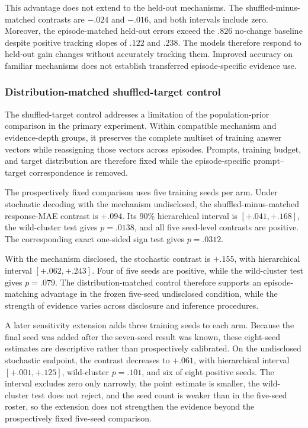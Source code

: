 This advantage does not extend to the held-out mechanisms.
The shuffled-minus-matched contrasts are \(-.024\) and \(-.016\), and both intervals include zero.
Moreover, the episode-matched held-out errors exceed the $.826$ no-change baseline despite positive tracking slopes of $.122$ and $.238$.
The models therefore respond to held-out gain changes without accurately tracking them.
Improved accuracy on familiar mechanisms does not establish transferred episode-specific evidence use.

\subsubsection{Distribution-matched shuffled-target control}
\label{app:exp3-shuffled-control}

The shuffled-target control addresses a limitation of the population-prior comparison in the primary experiment.
Within compatible mechanism and evidence-depth groups, it preserves the complete multiset of training answer vectors while reassigning those vectors across episodes.
Prompts, training budget, and target distribution are therefore fixed while the episode-specific prompt--target correspondence is removed.

The prospectively fixed comparison uses five training seeds per arm.
Under stochastic decoding with the mechanism undisclosed, the shuffled-minus-matched response-MAE contrast is \(+.094\).
Its 90\% hierarchical interval is \([+.041,+.168]\), the wild-cluster test gives \(p=.0138\), and all five seed-level contrasts are positive.
The corresponding exact one-sided sign test gives \(p=.0312\).

With the mechanism disclosed, the stochastic contrast is \(+.155\), with hierarchical interval \([+.062,+.243]\).
Four of five seeds are positive, while the wild-cluster test gives \(p=.079\).
The distribution-matched control therefore supports an episode-matching advantage in the frozen five-seed undisclosed condition, while the strength of evidence varies across disclosure and inference procedures.

A later sensitivity extension adds three training seeds to each arm.
Because the final seed was added after the seven-seed result was known, these eight-seed estimates are descriptive rather than prospectively calibrated.
On the undisclosed stochastic endpoint, the contrast decreases to \(+.061\), with hierarchical interval \([+.001,+.125]\), wild-cluster \(p=.101\), and six of eight positive seeds.
The interval excludes zero only narrowly, the point estimate is smaller, the wild-cluster test does not reject, and the seed count is weaker than in the five-seed roster, so the extension does not strengthen the evidence beyond the prospectively fixed five-seed comparison.

